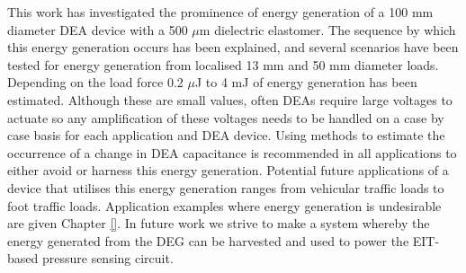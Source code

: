 This work has investigated the prominence of energy generation of a 100 mm diameter DEA device with a 500 $\mu$m dielectric elastomer. The sequence by which this energy generation occurs has been explained, and several scenarios have been tested for energy generation from localised 13 mm and 50 mm diameter loads. Depending on the load force 0.2 $\mu$J to 4 mJ of energy generation has been estimated. Although these are small values, often DEAs require large voltages to actuate so any amplification of these voltages needs to be handled on a case by case basis for each application and DEA device. Using methods to estimate the occurrence of a change in DEA capacitance is recommended in all applications to either avoid or harness this energy generation. Potential future applications of a device that utilises this energy generation ranges from vehicular traffic loads to foot traffic loads. Application examples where energy generation is undesirable are given Chapter \ref{}. In future work we strive to make a system whereby the energy generated from the DEG can be harvested and used to power the EIT-based pressure sensing circuit. 